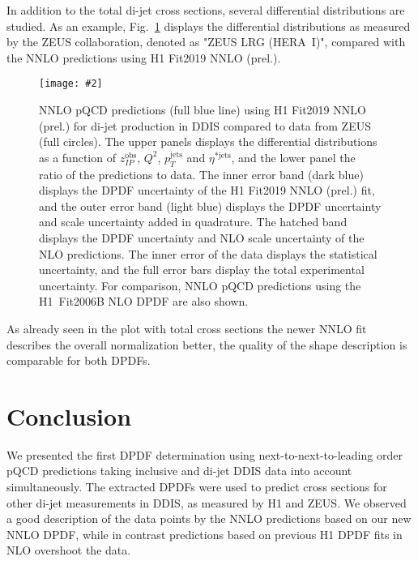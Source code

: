 \documentclass{PoS}
\newcommand{\IP}{I\!\!P}
\newcommand{\includegraphicss}[2][]{\texttt{[image: \#2]}}
\begin{document}
In addition to the total di-jet cross sections, several differential distributions are studied.
As an example, Fig.~\ref{figZEUSdiff} displays the differential distributions as measured by the ZEUS collaboration, denoted as "ZEUS LRG (HERA~I)", compared with the NNLO predictions using H1 Fit2019 NNLO (prel.).
\begin{figure}[h]
\centering
\includegraphicss[trim={0cm 0.3cm 0 0.3cm},clip,width=.8\textwidth]{{{plots/H1prelim-19-013.fig7}}}
\caption{ NNLO pQCD predictions (full blue line) using H1 Fit2019 NNLO (prel.) for di-jet production in DDIS compared to data from ZEUS (full circles). The upper panels displays the differential distributions as a function of $z_{\IP}^\mathrm{obs}$, $Q^2$, $p_T^\mathrm{jets}$ and $\eta^{*\mathrm{jets}}$, and the lower panel the ratio of the predictions to data. The inner error band (dark blue) displays the DPDF uncertainty of the H1 Fit2019 NNLO (prel.) fit, and the outer error band (light blue) displays the DPDF uncertainty and scale uncertainty added in quadrature. The hatched band displays the DPDF uncertainty and NLO scale uncertainty of the NLO predictions. The inner error of the data displays the statistical uncertainty, and the full error bars display the total experimental uncertainty. For comparison, NNLO pQCD predictions using the H1~Fit2006B NLO DPDF are also shown.}
\label{figZEUSdiff}
\end{figure}
As already seen in the plot with total cross sections the newer NNLO fit describes the overall normalization better, the quality of the shape description is comparable for both DPDFs.

\section{Conclusion}
We presented the first DPDF determination using next-to-next-to-leading order pQCD predictions taking inclusive and di-jet DDIS data into account simultaneously.
The extracted DPDFs were used to predict cross sections for other di-jet measurements in DDIS, as measured by H1 and ZEUS.
We observed a good description of the data points by the NNLO predictions based on our new NNLO DPDF, while in contrast predictions based on previous H1 DPDF fits in NLO overshoot the data.




\end{document}
